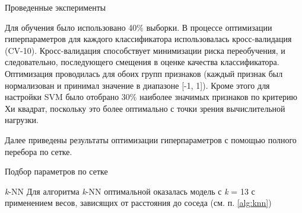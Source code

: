 

\begin{section}{Проведенные эксперименты}

Для обучения было использовано 40\% выборки. В процессе оптимизации гиперпараметров для каждого классификатора использовалась кросс-валидация (CV-10). Кросс-валидация способствует минимизации риска  переобучения, и следовательно, последующего смещения в оценке качества классификатора. Оптимизация проводилась для обоих групп признаков (каждый признак был нормализован и принимал значение в диапазоне [-1, 1]). Кроме этого для настройки SVM было отобрано 30\% наиболее значимых признаков по критерию Хи квадрат, поскольку это более оптимально с точки зрения вычислительной нагрузки.

Далее приведены результаты оптимизации гиперпараметров с помощью полного перебора по сетке.

\begin{subsection}{Подбор параметров по сетке}
\begin{subsubsection}{\textit{k}-NN}
  Для алгоритма \textit{k}-NN оптимальной оказалась модель с \textit{k} = 13 с применением весов, зависящих от расстояния до соседа (см. п. \ref{alg:knn})


\end{subsubsection}
\end{subsection}
\end{section}
